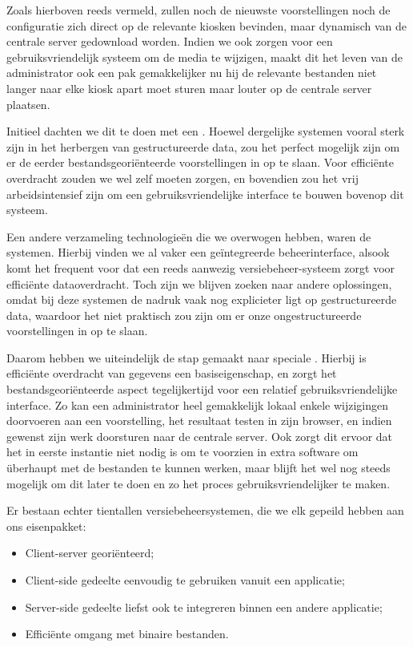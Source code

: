 Zoals hierboven reeds vermeld, zullen noch de nieuwste voorstellingen noch de configuratie zich direct op de relevante kiosken bevinden, maar dynamisch van de centrale server gedownload worden. Indien we ook zorgen voor een gebruiksvriendelijk systeem om de media te wijzigen, maakt dit het leven van de administrator ook een pak gemakkelijker nu hij de relevante bestanden niet langer naar elke kiosk apart moet sturen maar louter op de centrale server plaatsen.

Initieel dachten we dit te doen met een . Hoewel dergelijke systemen vooral sterk zijn in het herbergen van gestructureerde data, zou het perfect mogelijk zijn om er de eerder bestandsgeoriënteerde voorstellingen in op te slaan. Voor efficiënte overdracht zouden we wel zelf moeten zorgen, en bovendien zou het vrij arbeidsintensief zijn om een gebruiksvriendelijke interface te bouwen bovenop dit systeem.

Een andere verzameling technologieën die we overwogen hebben, waren de  systemen. Hierbij vinden we al vaker een geïntegreerde beheerinterface, alsook komt het frequent voor dat een reeds aanwezig versiebeheer-systeem zorgt voor efficiënte dataoverdracht. Toch zijn we blijven zoeken naar andere oplossingen, omdat bij deze systemen de nadruk vaak nog explicieter ligt op gestructureerde data, waardoor het niet praktisch zou zijn om er onze ongestructureerde voorstellingen in op te slaan.

Daarom hebben we uiteindelijk de stap gemaakt naar speciale . Hierbij is efficiënte overdracht van gegevens een basiseigenschap, en zorgt het bestandsgeoriënteerde aspect tegelijkertijd voor een relatief gebruiksvriendelijke interface. Zo kan een administrator heel gemakkelijk lokaal enkele wijzigingen doorvoeren aan een voorstelling, het resultaat testen in zijn browser, en indien gewenst zijn werk doorsturen naar de centrale server. Ook zorgt dit ervoor dat het in eerste instantie niet nodig is om te voorzien in extra software om überhaupt met de bestanden te kunnen werken, maar blijft het wel nog steeds mogelijk om dit later te doen en zo het proces gebruiksvriendelijker te maken.

Er bestaan echter tientallen versiebeheersystemen, die we elk gepeild hebben aan ons eisenpakket:
\begin{itemize}
\item Client-server georiënteerd;
\item Client-side gedeelte eenvoudig te gebruiken vanuit een applicatie;
\item Server-side gedeelte liefst ook te integreren binnen een andere applicatie;
\item Efficiënte omgang met binaire bestanden.
\end{itemize}

